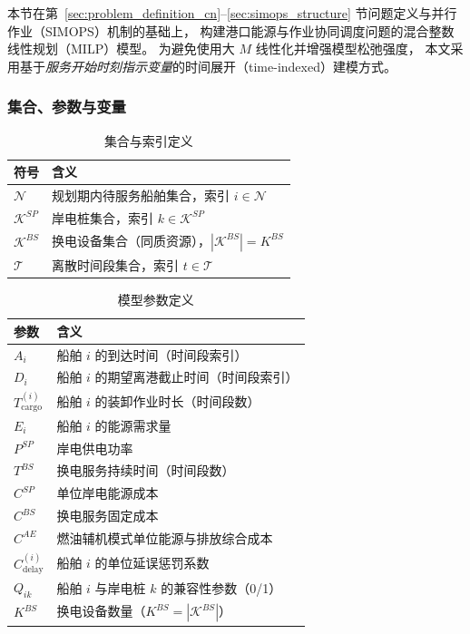 \documentclass[UTF8, a4paper, 12pt]{ctexart}
\theoremstyle{plain}
\theoremstyle{definition}
\theoremstyle{remark}
\begin{document}
本节在第~\ref{sec:problem_definition_cn}--\ref{sec:simops_structure} 节问题定义与并行作业（SIMOPS）机制的基础上，
构建港口能源与作业协同调度问题的混合整数线性规划（MILP）模型。
为避免使用大 $M$ 线性化并增强模型松弛强度，
本文采用基于\emph{服务开始时刻指示变量}的时间展开（time-indexed）建模方式。
\subsubsection{集合、参数与变量}

\begin{table}[!htbp]
\centering
\caption{集合与索引定义}
\begin{tabular}{ll}
\toprule
符号 & 含义 \\
\midrule
$\mathcal{N}$ & 规划期内待服务船舶集合，索引 $i \in \mathcal{N}$ \\
$\mathcal{K}^{SP}$ & 岸电桩集合，索引 $k \in \mathcal{K}^{SP}$ \\
$\mathcal{K}^{BS}$ & 换电设备集合（同质资源），$|\mathcal{K}^{BS}| = K^{BS}$ \\
$\mathcal{T}$ & 离散时间段集合，索引 $t \in \mathcal{T}$ \\
\bottomrule
\end{tabular}
\end{table}


\begin{table}[!htbp]
\centering
\caption{模型参数定义}
\begin{tabular}{ll}
\toprule
参数 & 含义 \\
\midrule
$A_i$ & 船舶 $i$ 的到达时间（时间段索引） \\
$D_i$ & 船舶 $i$ 的期望离港截止时间（时间段索引） \\
$T^{(i)}_{\text{cargo}}$ & 船舶 $i$ 的装卸作业时长（时间段数） \\
$E_i$ & 船舶 $i$ 的能源需求量 \\
$P^{SP}$ & 岸电供电功率 \\
$T^{BS}$ & 换电服务持续时间（时间段数） \\
$C^{SP}$ & 单位岸电能源成本 \\
$C^{BS}$ & 换电服务固定成本 \\
$C^{AE}$ & 燃油辅机模式单位能源与排放综合成本 \\
$C^{(i)}_{\text{delay}}$ & 船舶 $i$ 的单位延误惩罚系数 \\
$Q_{ik}$ & 船舶 $i$ 与岸电桩 $k$ 的兼容性参数（0/1） \\
$K^{BS}$ & 换电设备数量（$K^{BS}=|\mathcal{K}^{BS}|$） \\
\bottomrule
\end{tabular}
\end{table}
\end{document}
